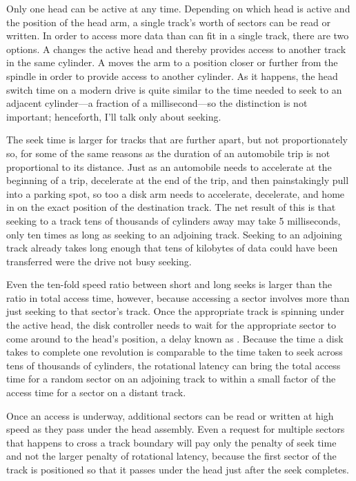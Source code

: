 Only one head can be active at any time.  Depending on which head is active
and the position of the head arm, a single track's worth of sectors can
be read or written.
In order to access more data than can fit in a single track, there are
two options.  A  changes the active head and
thereby provides access to another track in
the same cylinder.  A  moves the arm to a position closer or further
from the spindle in order to provide access to another cylinder.  As it happens, the head switch time on a modern
drive is quite similar to the time needed to seek to an adjacent
cylinder---a fraction of a millisecond---so the distinction is not important; henceforth, I'll talk
only about seeking.

The seek time is larger for tracks that are further apart, but not
proportionately so, for some of the same reasons as the duration of an
automobile trip is not proportional to its distance.  Just as an
automobile needs to accelerate at the beginning of a trip, decelerate
at the end of the trip, and then painstakingly pull into a parking
spot, so too a disk arm needs to accelerate, decelerate, and home in
on the exact position of the destination track.  The net result of
this is that seeking to a track tens of thousands of cylinders away
may take 5 milliseconds, only ten times as long as seeking to an adjoining track.
Seeking to an adjoining track already takes long enough that tens of
kilobytes of data could have been transferred were the drive not busy
seeking.

Even the ten-fold speed ratio between short and long seeks is
larger than the ratio in total access time, however, because accessing a sector involves more than
just seeking to that sector's track.  Once the appropriate track is
spinning under the active head, the disk controller needs to wait for
the appropriate sector to come around to the head's position, a delay
known as .  Because the time a disk
takes to complete one revolution is comparable to the time taken to
seek across tens of thousands of cylinders, the rotational latency can
bring the total access time for a random sector on an adjoining track
to within a small factor of the access time for a sector on a distant
track.

Once an access is underway, additional sectors can be read or written
at high speed as they pass under the head assembly.  Even a request
for multiple sectors that happens to cross a track boundary will pay
only the penalty of seek time and not the larger penalty of rotational latency,
because the first sector of the track is positioned so that it passes under the head just
after the seek completes.

